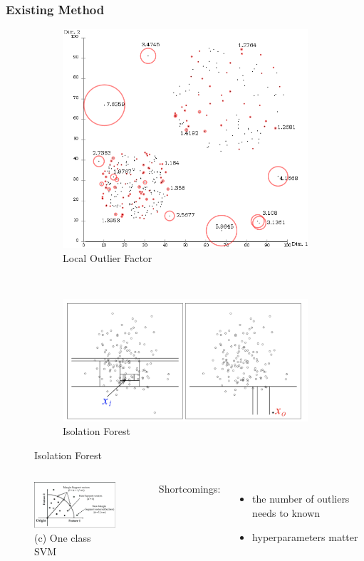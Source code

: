 \documentclass[notheorems]{beamer}
\begin{document}
\begin{frame}
\frametitle{Existing Method}
\begin{figure}
	\centering
	\begin{subfigure}{0.33\textwidth}
		\includegraphics[width=\textwidth]{pic/lof.png}
		\caption{Local Outlier Factor}
	\end{subfigure}~
	\begin{subfigure}{0.58\textwidth}
		\includegraphics[width=\textwidth]{pic/if.png}
		\caption{Isolation Forest}
	\end{subfigure}
\end{figure}  
	\begin{columns}
\begin{figure}
		\includegraphics[width=4.5cm]{pic/one_class_svm.png}
		\caption*{ \textcolor{thupurple}{(c)} One class SVM}
\end{figure}
\quad Shortcomings:
\begin{itemize}
\item the number of outliers needs to known 
\item hyperparameters matter
\end{itemize}
\end{columns}
\end{frame}
\end{document}
